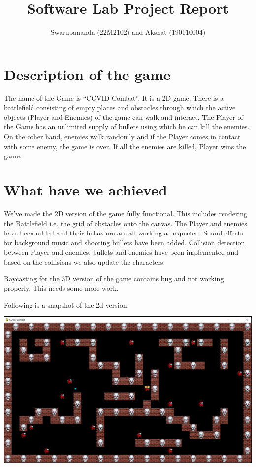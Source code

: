\documentclass{article}
\title{Software Lab Project Report}
\author{Swarupananda (22M2102) and Akshat (190110004)}
\begin{document}
\maketitle

\section{Description of the game}
The name of the Game is “COVID Combat”. It is a 2D game. There is a battlefield consisting of empty places and obstacles through which the active objects (Player and Enemies) of the game can walk and interact. The Player of the Game has an unlimited supply of bullets using which he can kill the enemies. On the other hand, enemies walk randomly and if the Player comes in contact with some enemy, the game is over. If all the enemies are killed, Player wins the game.

\section{What have we achieved}
We've made the 2D version of the game fully functional. This includes rendering the Battlefield i.e. the grid of obstacles onto the canvas. The Player and enemies have been added and their behaviors are all working as expected. Sound effects for background music and shooting bullets have been added. Collision detection between Player and enemies, bullets and enemies have been implemented and based on the collisions we also update the characters. 

Raycasting for the 3D version of the game contains bug and not working properly. This needs some more work.

Following is a snapshot of the 2d version.

\includegraphics[scale=0.4]{snapshot}
\end{document}
